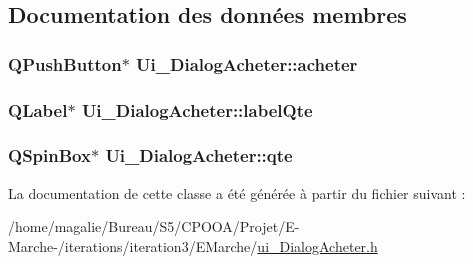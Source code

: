 \subsection{Documentation des données membres}
\hypertarget{class_ui___dialog_acheter_af6b53b197038b75c9c93a5a2bd7775a4}{
\subsubsection[{acheter}]{\setlength{\rightskip}{0pt plus 5cm}Q\-Push\-Button$\ast$ Ui\-\_\-\-Dialog\-Acheter\-::acheter}}\label{class_ui___dialog_acheter_af6b53b197038b75c9c93a5a2bd7775a4}
\hypertarget{class_ui___dialog_acheter_adfd72bae8a9c183780299127920f4438}{
\subsubsection[{label\-Qte}]{\setlength{\rightskip}{0pt plus 5cm}Q\-Label$\ast$ Ui\-\_\-\-Dialog\-Acheter\-::label\-Qte}}\label{class_ui___dialog_acheter_adfd72bae8a9c183780299127920f4438}
\hypertarget{class_ui___dialog_acheter_a21affb75243ff68116a045006c8ac3f6}{
\subsubsection[{qte}]{\setlength{\rightskip}{0pt plus 5cm}Q\-Spin\-Box$\ast$ Ui\-\_\-\-Dialog\-Acheter\-::qte}}\label{class_ui___dialog_acheter_a21affb75243ff68116a045006c8ac3f6}


La documentation de cette classe a été générée à partir du fichier suivant \-:\begin{DoxyCompactItemize}
\item 
/home/magalie/\-Bureau/\-S5/\-C\-P\-O\-O\-A/\-Projet/\-E-\/\-Marche-\//iterations/iteration3/\-E\-Marche/\hyperlink{ui___dialog_acheter_8h}{ui\-\_\-\-Dialog\-Acheter.\-h}\end{DoxyCompactItemize}
